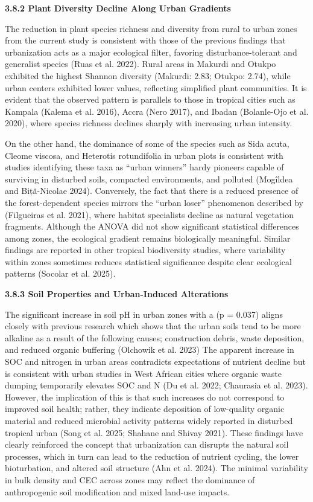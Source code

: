 {}\textbf{3.8.2 Plant Diversity Decline Along Urban Gradients}

The reduction in plant species richness and diversity from rural to urban zones from the current study is consistent with those of the previous findings that urbanization acts as a major ecological filter, favoring disturbance-tolerant and generalist species (Ruas et al. 2022). Rural areas in Makurdi and Otukpo exhibited the highest Shannon diversity (Makurdi: 2.83; Otukpo: 2.74), while urban centers exhibited lower values, reflecting simplified plant communities. It is evident that the observed pattern is parallels to those in tropical cities such as Kampala (Kalema et al. 2016), Accra (Nero 2017), and Ibadan (Bolanle-Ojo et al. 2020), where species richness declines sharply with increasing urban intensity.

On the other hand, the dominance of some of the species such as Sida acuta, Cleome viscosa, and Heterotis rotundifolia in urban plots is consistent with studies identifying these taxa as ``urban winners'' hardy pioneers capable of surviving in disturbed soils, compacted environments, and polluted (Mogîldea and Biță-Nicolae 2024). Conversely, the fact that there is a reduced presence of the forest-dependent species mirrors the ``urban loser'' phenomenon described by (Filgueiras et al. 2021), where habitat specialists decline as natural vegetation fragments. Although the ANOVA did not show significant statistical differences among zones, the ecological gradient remains biologically meaningful. Similar findings are reported in other tropical biodiversity studies, where variability within zones sometimes reduces statistical significance despite clear ecological patterns (Socolar et al. 2025).

{}\textbf{3.8.3 Soil Properties and Urban-Induced Alterations}

The significant increase in soil pH in urban zones with a (p = 0.037) aligns closely with previous research which shows that the urban soils tend to be more alkaline as a result of the following causes; construction debris, waste deposition, and reduced organic buffering (Olchowik et al. 2023) The apparent increase in SOC and nitrogen in urban areas contradicts expectations of nutrient decline but is consistent with urban studies in West African cities where organic waste dumping temporarily elevates SOC and N (Du et al. 2022; Chaurasia et al. 2023). However, the implication of this is that such increases do not correspond to improved soil health; rather, they indicate deposition of low-quality organic material and reduced microbial activity patterns widely reported in disturbed tropical urban (Song et al. 2025; Shahane and Shivay 2021). These findings have clearly reinforced the concept that urbanization can disrupts the natural soil processes, which in turn can lead to the reduction of nutrient cycling, the lower bioturbation, and altered soil structure (Ahn et al. 2024). The minimal variability in bulk density and CEC across zones may reflect the dominance of anthropogenic soil modification and mixed land-use impacts.

